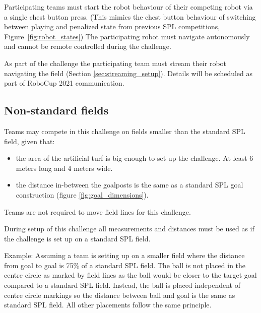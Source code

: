Participating teams must start the robot behaviour of their competing robot via a single chest button press. (This mimics the chest button behaviour of switching between playing and penalized state from previous SPL competitions, \cf Figure~\ref{fig:robot_states}) The participating robot must navigate autonomously and cannot be remote controlled during the challenge.

As part of the challenge the participating team must stream their robot navigating the field (\cf Section \ref{sec:streaming_setup}). Details will be scheduled as part of RoboCup 2021 communication.

\subsection{Non-standard fields}

Teams may compete in this challenge on fields smaller than the standard SPL field, given that:

\begin{itemize}
	\item the area of the artificial turf is big enough to set up the challenge. At least 6 meters long and 4 meters wide.
	\item the distance in-between the goalposts is the same as a standard SPL goal construction (\cf figure \ref{fig:goal_dimensions}).
\end{itemize}

Teams are not required to move field lines for this challenge.

During setup of this challenge all measurements and distances must be used as if the challenge is set up on a standard SPL field.

Example: Assuming a team is setting up on a smaller field where the distance from goal to goal is 75\% of a standard SPL field. The ball is not placed in the centre circle as marked by field lines as the ball would be closer to the target goal compared to a standard SPL field. Instead, the ball is placed independent of centre circle markings so the distance between ball and goal is the same as standard SPL field. All other placements follow the same principle.
